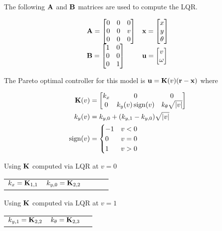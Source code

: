 \begin{theorem}
  The following $\mathbf{A}$ and $\mathbf{B}$ matrices are used to compute the LQR.

  \begin{equation}
    \begin{array}{ll}
      \mathbf{A} =
      \begin{bmatrix}
        0 & 0 & 0 \\
        0 & 0 & v \\
        0 & 0 & 0
      \end{bmatrix} &
      \mathbf{x} =
      \begin{bmatrix}
        x \\
        y \\
        \theta
      \end{bmatrix} \\
      \mathbf{B} =
      \begin{bmatrix}
        1 & 0 \\
        0 & 0 \\
        0 & 1
      \end{bmatrix} &
      \mathbf{u} =
      \begin{bmatrix}
        v \\
        \omega
      \end{bmatrix}
    \end{array}
  \end{equation}

  The Pareto optimal controller for this model is
  $\mathbf{u} = \mathbf{K}(v) (\mathbf{r} - \mathbf{x})$ where

  \begin{align}
    \mathbf{K}(v) &= \begin{bmatrix}
      k_x & 0 & 0 \\
      0 & k_y(v) \operatorname{sign}(v) & k_{\theta} \sqrt{|v|}
    \end{bmatrix} \\
    k_y(v) &= k_{y, 0} + (k_{y, 1} - k_{y, 0}) \sqrt{|v|} \\
    \operatorname{sign}(v) &= \begin{cases}
      -1 & v < 0 \\
      0 & v = 0 \\
      1 & v > 0
    \end{cases}
  \end{align}

  Using $\mathbf{K}$ computed via LQR at $v = 0$
  \begin{figurekey}
    \begin{tabular}{lllll}
      $k_x = \mathbf{K}_{1, 1}$ & $k_{y, 0} = \mathbf{K}_{2, 2}$
    \end{tabular}
  \end{figurekey}

  Using $\mathbf{K}$ computed via LQR at $v = 1$
  \begin{figurekey}
    \begin{tabular}{lll}
        $k_{y, 1} = \mathbf{K}_{2, 2}$ & $k_{\theta} = \mathbf{K}_{2, 3}$
    \end{tabular}
  \end{figurekey}
\end{theorem}
